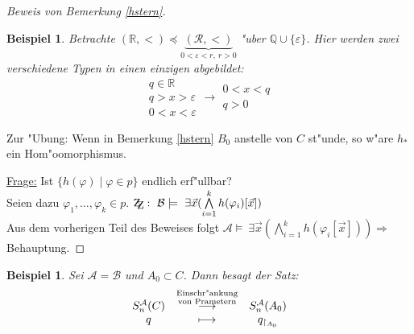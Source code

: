 \documentclass[a4paper,12pt,numbers=noenddot,parskip=full]{scrartcl}
\newcommand{\setQ}{\mathbb{Q}}
\newcommand{\setR}{\mathbb{R}}
\newcommand{\Exists}{~\exists}
\newcommand{\scrA}{\mathcal{A}}
\newcommand{\scrB}{\mathcal{B}}
\newcommand{\zz}{\mathrm{Z\kern-.3em\raise-0.5ex\hbox{Z}}:~}
\theoremstyle{dotless}
\newtheorem{example}[theorem]{Beispiel}
\begin{document}
\begin{proof}[Beweis von Bemerkung \ref{hstern}]
	\begin{example}
		Betrachte $(\setR, <) \preceq \underbrace{(\mathcal{R}, <)}_{0 < \varepsilon < r,~ r>0}$ "uber $\setQ \cup \{\varepsilon\}$. Hier werden zwei verschiedene Typen in einen einzigen abgebildet:
		\begin{equation*}
			\begin{array}{c}
				q \in \setR\\
				q>x>\varepsilon\\
				0<x<\varepsilon
			\end{array} \longrightarrow \begin{array}{c}
				0<x<q\\
				q>0
			\end{array}
		\end{equation*}
	\end{example}
	Zur "Ubung: Wenn in Bemerkung \ref{hstern} $B_0$ anstelle von $C$ st"unde, so w"are $h_*$ ein Hom"oomorphismus.
	
	\underline{Frage:} Ist $\{h(\varphi) \mid \varphi \in p \}$ endlich erf"ullbar?\\
	Seien dazu $\varphi_1, \dots, \varphi_k \in p$. $\zz \scrB \models \Exists \vec{x} (\bigwedge\limits_{i=1}^k h(\varphi_i)[\vec{x}])$\\
	Aus dem vorherigen Teil des Beweises folgt $\scrA \models \Exists \vec{x}(\bigwedge\limits_{i=1}^k h(\varphi_i[\vec{x}])) \Longrightarrow$ Behauptung.
\end{proof}
\begin{example}
	Sei $\scrA = \scrB$ und $A_0 \subset C$. Dann besagt der Satz:
	\begin{equation*}
		\begin{array}{c c c}
			S_n^\scrA(C) &\overset{\substack{\text{Einschr"ankung}\\\text{von Prametern}}}{\longrightarrow} &S_n^\scrA (A_0)\\
			q &\longmapsto & q_{\upharpoonright_{A_0}}
		\end{array}
	\end{equation*}
\end{example}
\newpage
\end{document}

